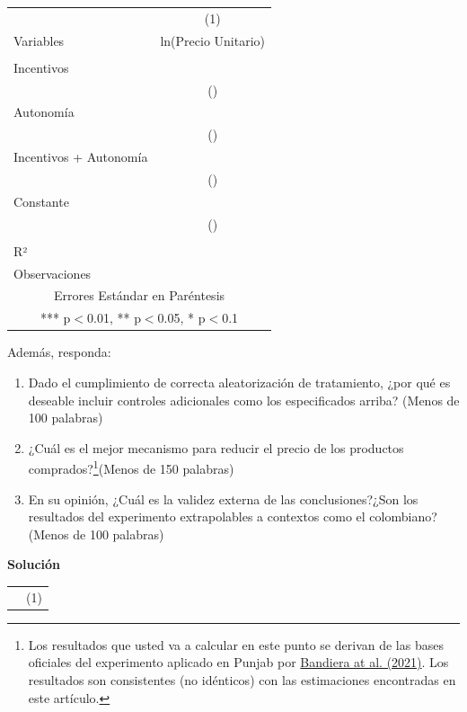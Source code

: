\documentclass[a4paper, answers, addpoints, 11pt]{exam}
\newenvironment{solucion}{%
  \begin{mdframed}[
    backgroundcolor=blue!5,    %
    linecolor=blue!50,          %
    linewidth=2pt,              %
    leftmargin=10pt,            %
    rightmargin=10pt,           %
    topline=true,              %
    bottomline=true,            %
    roundcorner=10pt,           %
    innerleftmargin=10pt,       %
    innerrightmargin=10pt,      %
    innerbottommargin=10pt,     %
    innertopmargin=10pt         %
  ]%
  \begin{tcolorbox}[colframe=blue!50!black, colback=blue!50, coltitle=white, sharp corners=all, boxrule=1mm, width=\textwidth, halign=left, valign=center, top=0mm, bottom=0mm, left=0mm, right=0mm] \textbf{Solución} \end{tcolorbox} }{\end{mdframed}}
\begin{document}
\begin{enumerate}
    \begin{table}[H]
        \centering
        \begin{tabular}{lc} \hline
 & (1) \\
Variables & ln(Precio Unitario) \\ \hline
 &  \\
Incentivos &  \\
 & () \\
Autonomía &  \\
 & () \\
 Incentivos + Autonomía&  \\
 & () \\
Constante &  \\
 & () \\
 &  \\
R² &  \\
Observaciones &  \\ \hline
\multicolumn{2}{c}{ Errores Estándar en Paréntesis} \\
\multicolumn{2}{c}{ *** p$<$0.01, ** p$<$0.05, * p$<$0.1} \\
\end{tabular}
    \end{table}
    Además, responda:
   \begin{enumerate}
        \item Dado el cumplimiento de correcta aleatorización de tratamiento, ¿por qué es deseable incluir controles adicionales como los especificados arriba? (Menos de 100 palabras)
       \item ¿Cuál es el mejor mecanismo para reducir el precio de los productos comprados?\footnote{\footnotesize{Los resultados que usted va a calcular en este punto se derivan de las bases oficiales del experimento aplicado en Punjab por \href{https://academic.oup.com/qje/article-abstract/136/4/2195/6354797?redirectedFrom=fulltext}{Bandiera at al. (2021)}. Los resultados son consistentes (no idénticos) con las estimaciones encontradas en este artículo.}}(Menos de 150 palabras)
       \item En su opinión, ¿Cuál es la validez externa de las conclusiones?¿Son los resultados del experimento extrapolables a contextos como el colombiano? (Menos de 100 palabras)
   \end{enumerate}
   \begin{solucion}
     \begin{table}[H]
        \centering
        \begin{tabular}{lc} \hline
 & (1) \\

\end{tabular}
\end{table}
\end{solucion}
\end{enumerate}
\end{document}

